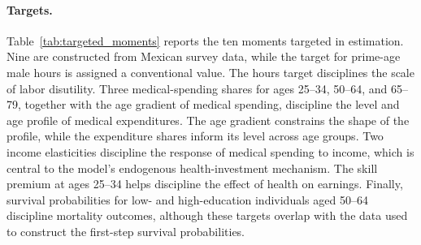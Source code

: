 \documentclass[12pt,a4paper]{article}
\begin{document}
\paragraph{Targets.}
Table~\ref{tab:targeted_moments} reports the ten moments targeted in estimation. Nine are constructed from Mexican survey data, while the target for prime-age male hours is assigned a conventional value. The hours target disciplines the scale of labor disutility. Three medical-spending shares for ages 25--34, 50--64, and 65--79, together with the age gradient of medical spending, discipline the level and age profile of medical expenditures. The age gradient constrains the shape of the profile, while the expenditure shares inform its level across age groups. Two income elasticities discipline the response of medical spending to income, which is central to the model's endogenous health-investment mechanism. The skill premium at ages 25--34 helps discipline the effect of health on earnings. Finally, survival probabilities for low- and high-education individuals aged 50--64 discipline mortality outcomes, although these targets overlap with the data used to construct the first-step survival probabilities.
\end{document}
